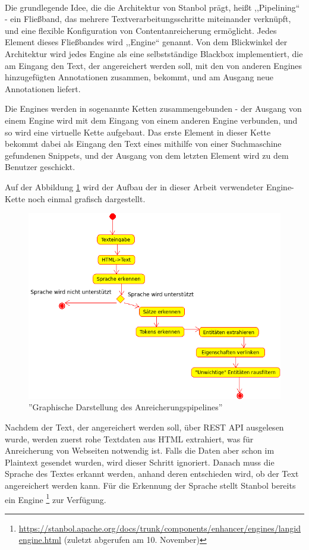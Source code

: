 \paragraph{}
Die grundlegende Idee, die die Architektur von Stanbol prägt, heißt ,,Pipelining`` - ein Fließband, das mehrere Textverarbeitungsschritte miteinander verknüpft, und eine flexible Konfiguration von Contentanreicherung ermöglicht. Jedes Element dieses Fließbandes wird ,,Engine`` genannt. Von dem Blickwinkel der Architektur wird jedes Engine als eine selbstständige Blackbox implementiert, die am Eingang den Text, der angereichert werden soll, mit den von anderen Engines hinzugefügten Annotationen zusammen, bekommt, und am Ausgang neue Annotationen liefert. 

Die Engines werden in sogenannte Ketten zusammengebunden - der Ausgang von einem Engine wird mit dem Eingang von einem anderen Engine verbunden, und so wird eine virtuelle Kette aufgebaut. Das erste Element in dieser Kette bekommt dabei als Eingang den Text eines mithilfe von einer Suchmaschine gefundenen Snippets, und der Ausgang von dem letzten Element wird zu dem Benutzer geschickt.

Auf der Abbildung \ref{fig:ENGINEPIPELINE} wird der Aufbau der in dieser Arbeit verwendeter Engine-Kette noch einmal grafisch dargestellt.
\begin{figure}[ht]
\centering
\includegraphics[width=\textwidth]{Bilder/enchancer.png}
\caption{''Graphische Darstellung des Anreicherungspipelines''}
\label{fig:ENGINEPIPELINE}
\end{figure}
Nachdem der Text, der angereichert werden soll, über REST API ausgelesen wurde, werden zuerst rohe Textdaten aus HTML extrahiert, was für Anreicherung von Webseiten notwendig ist. Falls die Daten aber schon im Plaintext gesendet wurden, wird dieser Schritt ignoriert. Danach muss die Sprache des Textes erkannt werden, anhand deren entschieden wird, ob der Text angereichert werden kann. Für die Erkennung der Sprache stellt Stanbol bereits ein Engine \footnote{\url{https://stanbol.apache.org/docs/trunk/components/enhancer/engines/langidengine.html} (zuletzt abgerufen am 10. November)} zur Verfügung.

